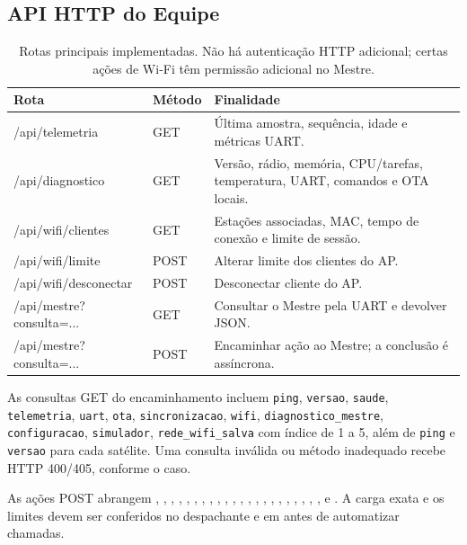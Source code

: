 \subsection{API HTTP do Equipe}\label{sec:api-equipe}
\begin{table}[htbp]\centering\small
\begin{tabularx}{\textwidth}{>{\ttfamily}p{4.5cm}p{1.4cm}X}
\toprule
\normalfont\bfseries Rota & \bfseries Método & \bfseries Finalidade\\
\midrule
/api/telemetria & GET & Última amostra, sequência, idade e métricas UART.\\
/api/diagnostico & GET & Versão, rádio, memória, CPU/tarefas, temperatura, UART, comandos e OTA locais.\\
/api/wifi/clientes & GET & Estações associadas, MAC, tempo de conexão e limite de sessão.\\
/api/wifi/limite & POST & Alterar limite dos clientes do AP.\\
/api/wifi/desconectar & POST & Desconectar cliente do AP.\\
/api/mestre?consulta=... & GET & Consultar o Mestre pela UART e devolver JSON.\\
/api/mestre?consulta=... & POST & Encaminhar ação ao Mestre; a conclusão é assíncrona.\\
\bottomrule
\end{tabularx}
\caption{Rotas principais implementadas. Não há autenticação HTTP adicional; certas ações de Wi-Fi têm permissão adicional no Mestre.}\label{tab:apis-web}
\end{table}

As consultas GET do encaminhamento incluem \texttt{ping}, \texttt{versao}, \texttt{saude}, \texttt{telemetria}, \texttt{uart}, \texttt{ota}, \texttt{sincronizacao}, \texttt{wifi}, \texttt{diagnostico\_mestre}, \texttt{configuracao}, \texttt{simulador}, \texttt{rede\_wifi\_salva} com índice de 1 a 5, além de \texttt{ping} e \texttt{versao} para cada satélite. Uma consulta inválida ou método inadequado recebe HTTP 400/405, conforme o caso.

As ações POST abrangem , , , , , , , , , , , , , , , , , , , , , ,  e . A carga exata e os limites devem ser conferidos no despachante e em  antes de automatizar chamadas.

